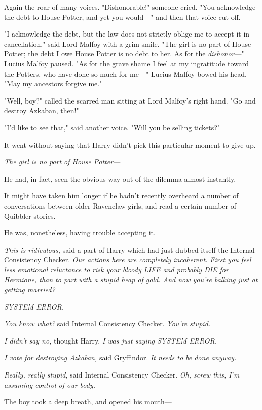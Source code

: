 Again the roar of many voices. "Dishonorable!" someone cried. "You acknowledge 
the debt to House Potter, and yet you would---" and then that voice cut off.

"I acknowledge the debt, but the law does not strictly oblige me to accept it 
in cancellation," said Lord Malfoy with a grim smile. "The girl is no part of 
House Potter; the debt I owe House Potter is no debt to her. As for the 
\emph{dishonor}---" Lucius Malfoy paused. "As for the grave shame I feel at my 
ingratitude toward the Potters, who have done so much for me---" Lucius Malfoy 
bowed his head. "May my ancestors forgive me."

"Well, boy?" called the scarred man sitting at Lord Malfoy's right hand. "Go 
and destroy Azkaban, then!"

"I'd like to see that," said another voice. "Will you be selling tickets?"

It went without saying that Harry didn't pick this particular moment to give up.

\emph{The girl is no part of House Potter---}

He had, in fact, seen the obvious way out of the dilemma almost instantly.

It might have taken him longer if he hadn't recently overheard a number of 
conversations between older Ravenclaw girls, and read a certain number of 
Quibbler stories.

He was, nonetheless, having trouble accepting it.

\emph{This is ridiculous,} said a part of Harry which had just dubbed itself 
the Internal Consistency Checker. \emph{Our actions here are completely 
incoherent. First you feel less emotional reluctance to risk your bloody LIFE 
and probably DIE for Hermione, than to part with a stupid heap of gold. And now 
you're balking just at getting married?}

\emph{SYSTEM ERROR.}

\emph{You know what?} said Internal Consistency Checker. \emph{You're stupid.}

\emph{I didn't say no,} thought Harry. \emph{I was just saying SYSTEM ERROR.}

\emph{I vote for destroying Azkaban,} said Gryffindor. \emph{It needs to be 
done anyway.}

\emph{Really, really stupid,} said Internal Consistency Checker. \emph{Oh, 
screw this, I'm assuming control of our body.}

The boy took a deep breath, and opened his mouth---

